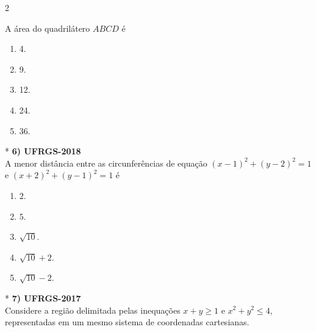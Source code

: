 \documentclass[11pt,a4paper]{article}
\begin{document}
\begin{paracol}{2}
\begin{center}
    \end{center}
    \vspace{0.3cm}

    A área do quadrilátero $ABCD$ é

    \begin{enumerate}[label=(\Alph*), itemsep=0.2cm]
        \item 4.
        \item 9.
        \item 12.
        \item 24.
        \item 36.
    \end{enumerate}
    \vspace{0.4cm}

    \switchcolumn[1]
    \vspace{9.5cm}

    \switchcolumn[0]*
    \textbf{6) UFRGS-2018} \\
    A menor distância entre as circunferências de equação $(x - 1)^2 + (y - 2)^2 = 1$ e $(x + 2)^2 + (y - 1)^2 = 1$ é

    \vspace{0.3cm}
    \begin{enumerate}[label=(\Alph*), itemsep=0.2cm]
        \item $2$.
        \item $5$.
        \item $\sqrt{10}$.
        \item $\sqrt{10} + 2$.
        \item $\sqrt{10} - 2$.
    \end{enumerate}
    \vspace{0.4cm}

    \switchcolumn[1]
    \vspace{5cm}

    \switchcolumn[0]*
    \textbf{7) UFRGS-2017} \\
    Considere a região delimitada pelas inequações $x + y \ge 1$ e $x^2 + y^2 \le 4$, representadas em um mesmo sistema de coordenadas cartesianas.


\end{paracol}
\end{document}
